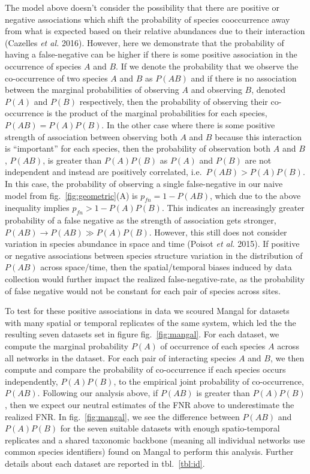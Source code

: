 \documentclass[11pt]{article}
\begin{document}
The model above doesn't consider the possibility that there are positive
or negative associations which shift the probability of species
cooccurrence away from what is expected based on their relative
abundances due to their interaction (Cazelles \emph{et al.} 2016).
However, here we demonstrate that the probability of having a
false-negative can be higher if there is some positive association in
the occurrence of species \(A\) and \(B\). If we denote the probability
that we observe the co-occurrence of two species \(A\) and \(B\) as
\(P(AB)\) and if there is no association between the marginal
probabilities of observing \(A\) and observing \(B\), denoted \(P(A)\)
and \(P(B)\) respectively, then the probability of observing their
co-occurrence is the product of the marginal probabilities for each
species, \(P(AB) = P(A)P(B)\). In the other case where there is some
positive strength of association between observing both \(A\) and \(B\)
because this interaction is ``important'' for each species, then the
probability of observation both \(A\) and \(B\), \(P(AB)\), is greater
than \(P(A)P(B)\) as \(P(A)\) and \(P(B)\) are not independent and
instead are positively correlated, i.e.~\(P(AB)> P(A)P(B)\). In this
case, the probability of observing a single false-negative in our naive
model from fig.~\ref{fig:geometric}(A) is \(p_{fn}= 1-P(AB)\), which due
to the above inequality implies \(p_{fn}>1-P(A)P(B)\). This indicates an
increasingly greater probability of a false negative as the strength of
association gets stronger, \(P(AB) \to P(AB) \gg P(A)P(B)\). However,
this still does not consider variation in species abundance in space and
time (Poisot \emph{et al.} 2015). If positive or negative associations
between species structure variation in the distribution of \(P(AB)\)
across space/time, then the spatial/temporal biases induced by data
collection would further impact the realized false-negative-rate, as the
probability of false negative would not be constant for each pair of
species across sites.

To test for these positive associations in data we scoured Mangal for
datasets with many spatial or temporal replicates of the same system,
which led the the resulting seven datasets set in figure
fig.~\ref{fig:mangal}. For each dataset, we compute the marginal
probability \(P(A)\) of occurrence of each species \(A\) across all
networks in the dataset. For each pair of interacting species \(A\) and
\(B\), we then compute and compare the probability of co-occurrence if
each species occurs independently, \(P(A)P(B)\), to the empirical joint
probability of co-occurrence, \(P(AB)\). Following our analysis above,
if \(P(AB)\) is greater than \(P(A)P(B)\), then we expect our neutral
estimates of the FNR above to underestimate the realized FNR. In
fig.~\ref{fig:mangal}, we see the difference between \(P(AB)\) and
\(P(A)P(B)\) for the seven suitable datasets with enough spatio-temporal
replicates and a shared taxonomic backbone (meaning all individual
networks use common species identifiers) found on Mangal to perform this
analysis. Further details about each dataset are reported in
tbl.~\ref{tbl:id}.
\end{document}
